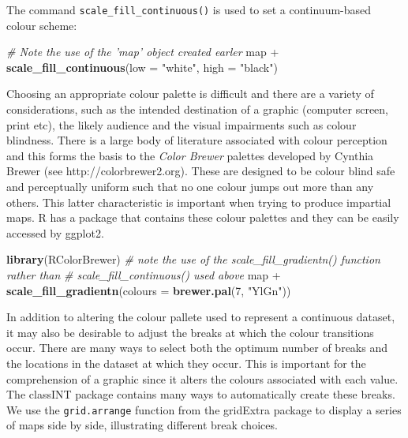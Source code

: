 \documentclass[]{article}
\newenvironment{Shaded}{}{}
\newcommand{\KeywordTok}[1]{\textcolor[rgb]{0.00,0.44,0.13}{\textbf{{#1}}}}
\newcommand{\DataTypeTok}[1]{\textcolor[rgb]{0.56,0.13,0.00}{{#1}}}
\newcommand{\DecValTok}[1]{\textcolor[rgb]{0.25,0.63,0.44}{{#1}}}
\newcommand{\StringTok}[1]{\textcolor[rgb]{0.25,0.44,0.63}{{#1}}}
\newcommand{\CommentTok}[1]{\textcolor[rgb]{0.38,0.63,0.69}{\textit{{#1}}}}
\newcommand{\NormalTok}[1]{{#1}}
\begin{document}
The command \texttt{scale\_fill\_continuous()} is used to set
a continuum-based colour scheme:

\begin{Shaded}
\begin{Highlighting}[]
\CommentTok{# Note the use of the 'map' object created earler}
\NormalTok{map + }\KeywordTok{scale_fill_continuous}\NormalTok{(}\DataTypeTok{low =} \StringTok{"white"}\NormalTok{, }\DataTypeTok{high =} \StringTok{"black"}\NormalTok{)}
\end{Highlighting}
\end{Shaded}

Choosing an appropriate colour palette is difficult and there are a variety of considerations,
such as the intended destination of a graphic (computer screen, print etc),
the likely audience and the visual impairments such as colour blindness.
There is a large body of literature associated with colour perception and
this forms the basis to the \emph{Color Brewer} palettes developed
by Cynthia Brewer (see http://colorbrewer2.org). These are designed to
be colour blind safe and perceptually uniform such that no one colour
jumps out more than any others. This latter characteristic is important
when trying to produce impartial maps. R has a package that contains these
colour palettes and they can be easily accessed by ggplot2.

\begin{Shaded}
\begin{Highlighting}[]
\KeywordTok{library}\NormalTok{(RColorBrewer)}
\CommentTok{# note the use of the scale_fill_gradientn() function rather than}
\CommentTok{# scale_fill_continuous() used above}
\NormalTok{map + }\KeywordTok{scale_fill_gradientn}\NormalTok{(}\DataTypeTok{colours =} \KeywordTok{brewer.pal}\NormalTok{(}\DecValTok{7}\NormalTok{, }\StringTok{"YlGn"}\NormalTok{))}
\end{Highlighting}
\end{Shaded}

In addition to altering the colour pallete used to represent a continuous
dataset, it may also be desirable to adjust the breaks at which the colour
transitions occur. There are many ways to select both the optimum number
of breaks and the locations in the dataset at
which they occur. This is important for the comprehension of a graphic
since it alters the colours associated with each value. The
classINT package contains many ways to automatically create
these breaks. We use the \texttt{grid.arrange} function from the
gridExtra package to display a series of maps side by side,  illustrating different break choices. 
\end{document}
